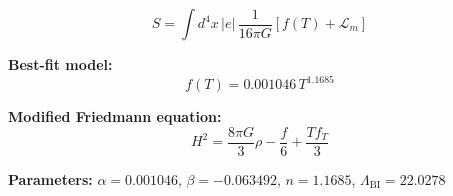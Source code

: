 
\begin{equation}
  S = \int d^4x \, |e| \, \frac{1}{16\pi G} \left[ f(T) + \mathcal{L}_m \right]
\end{equation}

\textbf{Best-fit model:}
\begin{equation}
  f(T) = 0.001046 \, T^{1.1685}
\end{equation}

\textbf{Modified Friedmann equation:}
\begin{equation}
  H^2 = \frac{8\pi G}{3} \rho - \frac{f}{6} + \frac{T f_T}{3}
\end{equation}

\textbf{Parameters:}
$\alpha = 0.001046$, \quad
$\beta = -0.063492$, \quad
$n = 1.1685$, \quad
$\Lambda_{\text{BI}} = 22.0278$